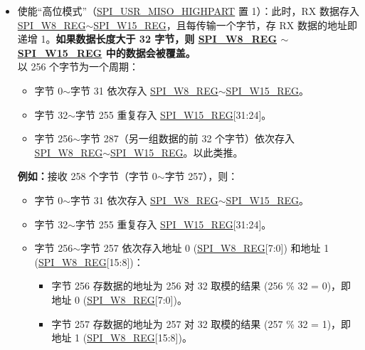 \documentclass[main\_\_CN.tex]{subfiles}
\begin{document}
\begin{itemize}
\begin{itemize}
        \item 使能“高位模式”（\hyperref[fielddesc:SPIUSRMISOHIGHPART]{SPI\_USR\_MISO\_HIGHPART} 置 1）：此时，RX 数据存入 \hyperref[regdesc:SPIW8REG]{SPI\_W8\_REG}$\sim$\hyperref[regdesc:SPIW15REG]{SPI\_W15\_REG}，且每传输一个字节，存 RX 数据的地址即递增 1。\textbf{如果数据长度大于 32 字节，则 \hyperref[regdesc:SPIW8REG]{SPI\_W8\_REG} $\sim$ \hyperref[regdesc:SPIW15REG]{SPI\_W15\_REG} 中的数据会被覆盖。}\\
        以 256 个字节为一个周期：
        \begin{itemize}
            \item 字节 0$\sim$字节 31 依次存入 \hyperref[regdesc:SPIW8REG]{SPI\_W8\_REG}$\sim$\hyperref[regdesc:SPIW15REG]{SPI\_W15\_REG}。
            \item 字节 32$\sim$字节 255 重复存入 \hyperref[regdesc:SPIW15REG]{SPI\_W15\_REG}[31:24]。
            \item 字节 256$\sim$字节 287（另一组数据的前 32 个字节）依次存入 \hyperref[regdesc:SPIW8REG]{SPI\_W8\_REG}$\sim$\hyperref[regdesc:SPIW15REG]{SPI\_W15\_REG}。以此类推。
        \end{itemize}
        \textbf{例如：}接收 258 个字节（字节 0$\sim$字节 257），则：
        \begin{itemize}
            \item 字节 0$\sim$字节 31 依次存入 \hyperref[regdesc:SPIW8REG]{SPI\_W8\_REG}$\sim$\hyperref[regdesc:SPIW15REG]{SPI\_W15\_REG}。
            \item 字节 32$\sim$字节 255 重复存入 \hyperref[regdesc:SPIW15REG]{SPI\_W15\_REG}[31:24]。
            \item 字节 256$\sim$字节 257 依次存入地址 0 (\hyperref[regdesc:SPIW8REG]{SPI\_W8\_REG}[7:0]) 和地址 1 (\hyperref[regdesc:SPIW8REG]{SPI\_W8\_REG}[15:8])：
            \begin{itemize}
                \item 字节 256 存数据的地址为 256 对 32 取模的结果 (256 \% 32 = 0)，即地址 0 (\hyperref[regdesc:SPIW8REG]{SPI\_W8\_REG}[7:0])。
                \item 字节 257 存数据的地址为 257 对 32 取模的结果 (257 \% 32 = 1)，即地址 1 (\hyperref[regdesc:SPIW8REG]{SPI\_W8\_REG}[15:8])。
            \end{itemize}
        \end{itemize}
    \end{itemize}
\end{itemize}
\end{document}
